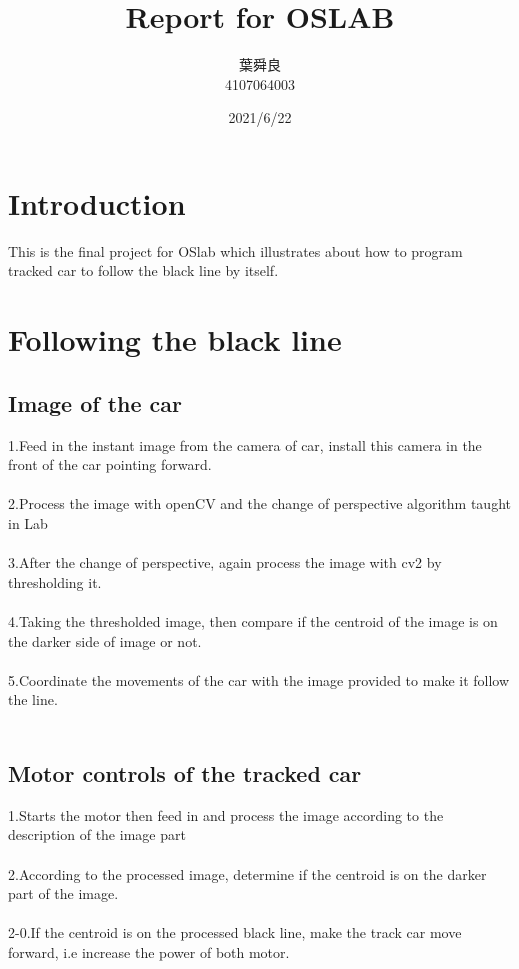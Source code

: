 \documentclass[12pt]{article}
\title{Report for OSLAB}
\date{2021/6/22}
\author{葉舜良 \\ 4107064003}
\begin{document}
\begin{CJK*}{UTF8}{bsmi}
\begin{titlepage}

\maketitle
\end{titlepage}

\end{CJK*}
\section{Introduction}
This is the final project for OSlab 
which illustrates about how to program tracked car to follow the black line by itself.


\section{Following the black line}
\subsection{Image of the car}
1.Feed in the instant image from the camera of car, install this camera in the front of the car pointing forward. \\\\
2.Process the image with openCV and the change of perspective algorithm taught in Lab\\\\
3.After the change of perspective, again process the image with cv2 by thresholding it.\\\\
4.Taking the thresholded image, then compare if the centroid of the image is on the darker side of image or not.\\\\
5.Coordinate the movements of the car with the image provided to make it follow the line.\\\\
 
\subsection{Motor controls of the tracked car}
1.Starts the motor then feed in and process the image according to the description of the image part\\\\
2.According to the processed image, determine if the centroid is on the darker part of the image.\\\\
2-0.If the centroid is on the processed black line, make the track car move forward, i.e increase the power of both motor. \\\\
\end{document}
